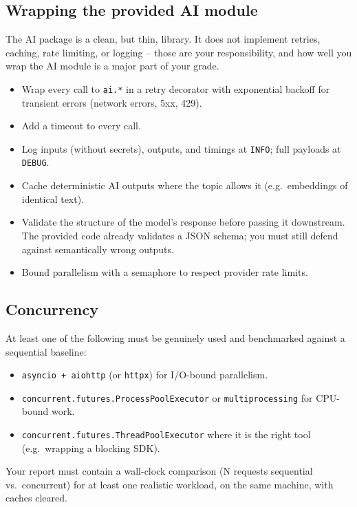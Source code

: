 \documentclass[11pt,a4paper]{article}
\begin{document}
\subsection{Wrapping the provided AI module}
The AI package is a clean, but thin, library. It does not implement retries, caching, rate limiting, or logging -- those are your responsibility, and how well you wrap the AI module is a major part of your grade.

\begin{itemize}[topsep=2pt,itemsep=1pt]
  \item Wrap every call to \texttt{ai.*} in a retry decorator with exponential backoff for transient errors (network errors, 5xx, 429).
  \item Add a timeout to every call.
  \item Log inputs (without secrets), outputs, and timings at \texttt{INFO}; full payloads at \texttt{DEBUG}.
  \item Cache deterministic AI outputs where the topic allows it (e.g.\ embeddings of identical text).
  \item Validate the structure of the model's response before passing it downstream. The provided code already validates a JSON schema; you must still defend against semantically wrong outputs.
  \item Bound parallelism with a semaphore to respect provider rate limits.
\end{itemize}

\subsection{Concurrency}
At least one of the following must be genuinely used and benchmarked against a sequential baseline:
\begin{itemize}[topsep=2pt,itemsep=1pt]
  \item \texttt{asyncio + aiohttp} (or \texttt{httpx}) for I/O-bound parallelism.
  \item \texttt{concurrent.futures.ProcessPoolExecutor} or \texttt{multiprocessing} for CPU-bound work.
  \item \texttt{concurrent.futures.ThreadPoolExecutor} where it is the right tool (e.g.\ wrapping a blocking SDK).
\end{itemize}
Your report must contain a wall-clock comparison (N requests sequential vs.\ concurrent) for at least one realistic workload, on the same machine, with caches cleared.
\end{document}
